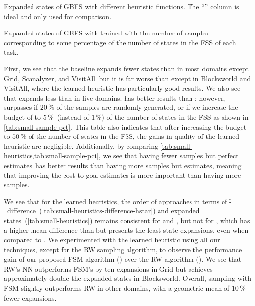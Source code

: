 \begin{table}[tb]
    \caption[Expanded states of different heuristic functions.]{Expanded states of GBFS with different heuristic functions. The ``\hstar'' column is ideal and only used for comparison.}
    \addmargin
    \label{tab:small-heuristics}
    \centering
    
\end{table}

\begin{table}[tb]
    \caption[Expanded states from different sample set sizes.]{Expanded states of GBFS with \hnnl{\rlmeanfx} trained with the number of samples corresponding to some percentage of the number of states in the FSS of each task.}
    \label{tab:small-sample-pct}
    \addmargin
    \centering
    
\end{table}

First, we see that the baseline \hnnbase expands fewer states than \hgc in most domains except Grid, Scanalyzer, and VisitAll, but it is far worse than \hff except in Blocksworld and VisitAll, where the learned heuristic has particularly good results. We also see that \hnnl{\rlmeanfx} expands less than \hnnbase in five domains. \hff has better results than \hnnl{\rlmeanfx}; however, \hnnl{\rlmeanfx} surpasses \hff if $20\,\%$ of the samples are randomly generated, or if we increase the budget of \hnnl{\rlmeanfx} to $5\,\%$~(instead of $1\,\%$) of the number of states in the FSS as shown in \cref{tab:small-sample-pct}. This table also indicates that after increasing the budget to $50\,\%$ of the number of states in the FSS, the gains in quality of the learned heuristic are negligible. Additionally, by comparing \cref{tab:small-heuristics,tab:small-sample-pct}, we see that having fewer samples but perfect estimates~\hstar has better results than having more samples but \hstar estimates, meaning that improving the cost-to-goal estimates is more important than having more samples.

We see that for the learned heuristics, the order of approaches in terms of \mbox{\h-\hstar}~difference~(\cref{tab:small-heuristics-difference-hstar}) and expanded states~(\cref{tab:small-heuristics}) remains consistent for \hnnbase and \hnnl{\rlmeanfx}, but not for \hnnrs, which has a higher mean difference than \hnnl{\rlmeanfx} but presents the least state expansions, even when compared to \hff. We experimented with the learned heuristic using all our techniques, except for the RW sampling algorithm, to observe the performance gain of our proposed FSM algorithm (\hnnrs) over the RW algorithm (\hnnrwrs). We see that RW's NN outperforms FSM's by ten expansions in Grid but achieves approximately double the expanded states in Blocksworld. Overall, sampling with FSM slightly outperforms RW in other domains, with a geometric mean of $10\,\%$ fewer expansions.

